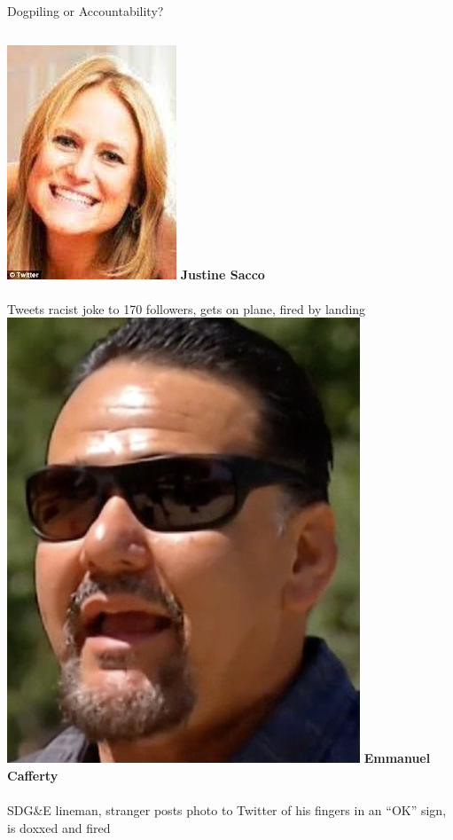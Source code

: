 \documentclass[nobackground,dvipsnames,table]{beamer}
\begin{document}
\begin{frame}{Dogpiling or Accountability?}
    \begin{columns}[T]
            \includegraphics[trim=0 0 0 0, clip, height=0.3\textheight]{justine-sacco}
            \textbf{Justine Sacco}\\~\\
            Tweets racist joke to 170 followers, gets on plane, fired by landing
            \includegraphics[height=0.3\textheight]{emmanuel-cafferty}
            \textbf{Emmanuel Cafferty}\\~\\
            SDG\&E lineman, stranger posts photo to Twitter of his fingers in an “OK” sign, is doxxed and fired

\end{columns}
\end{frame}
\end{document}
